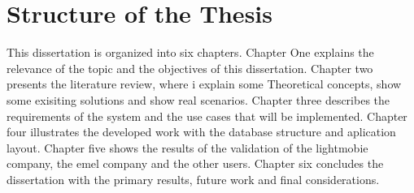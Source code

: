 \section{Structure of the Thesis}

This dissertation is organized into six chapters. Chapter One explains the relevance of the topic and the objectives of this dissertation.
Chapter two presents the literature review, where i explain some Theoretical concepts, show some exisiting solutions and show real scenarios. 
Chapter three describes the requirements of the system and the use cases that will be implemented.
Chapter four illustrates the developed work with the database structure and aplication layout.
Chapter five shows the results of the validation of the lightmobie company, the emel company and the other users.
Chapter six concludes the dissertation with the primary results, future work and final considerations. 


